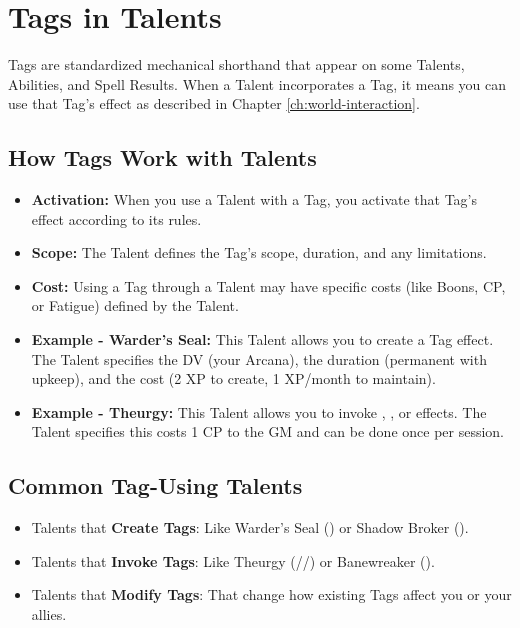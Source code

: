 \section{Tags in Talents}

Tags are standardized mechanical shorthand that appear on some Talents, Abilities, and Spell Results. When a Talent incorporates a Tag, it means you can use that Tag's effect as described in Chapter \ref{ch:world-interaction}.

\subsection*{How Tags Work with Talents}
\begin{itemize}
    \item \textbf{Activation:} When you use a Talent with a Tag, you activate that Tag's effect according to its rules.
    \item \textbf{Scope:} The Talent defines the Tag's scope, duration, and any limitations.
    \item \textbf{Cost:} Using a Tag through a Talent may have specific costs (like Boons, CP, or Fatigue) defined by the Talent.
    \item \textbf{Example - Warder's Seal:} This Talent allows you to create a  Tag effect. The Talent specifies the DV (your Arcana), the duration (permanent with upkeep), and the cost (2 XP to create, 1 XP/month to maintain).
    \item \textbf{Example - Theurgy:} This Talent allows you to invoke , , or  effects. The Talent specifies this costs 1 CP to the GM and can be done once per session.
\end{itemize}

\subsection*{Common Tag-Using Talents}
\begin{itemize}
    \item Talents that \textbf{Create Tags}: Like Warder's Seal () or Shadow Broker ().
    \item Talents that \textbf{Invoke Tags}: Like Theurgy (//) or Banewreaker ().
    \item Talents that \textbf{Modify Tags}: That change how existing Tags affect you or your allies.
\end{itemize}


